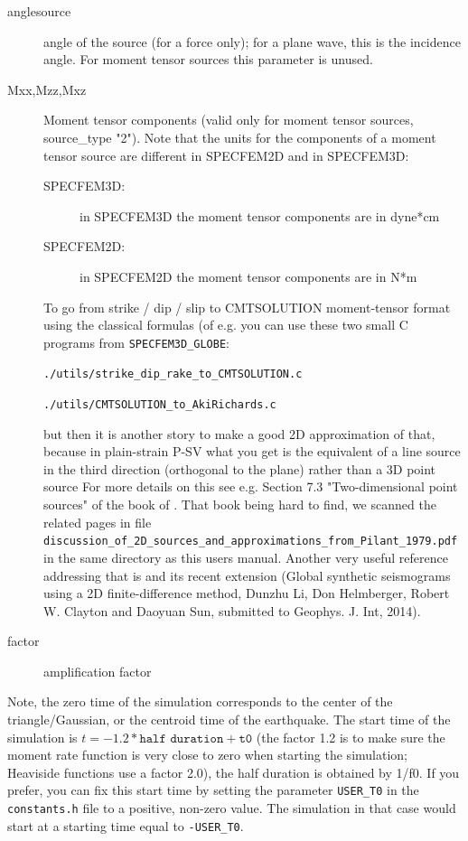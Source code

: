 \documentclass[oneside,english,onecolumn,letterpaper]{book}
\begin{document}
\begin{description}
\item[anglesource] angle of the source (for a force only); for a plane wave, this is the incidence angle. For moment tensor sources this parameter is unused.

\item[Mxx,Mzz,Mxz] Moment tensor components (valid only for moment tensor sources, source\_type "2").
Note that the units for the components of a moment tensor source are different in SPECFEM2D and in SPECFEM3D:
\begin{description}
\item[SPECFEM3D:] in SPECFEM3D the moment tensor components are in dyne*cm
\item[SPECFEM2D:] in SPECFEM2D the moment tensor components are in N*m
\end{description}

To go from strike / dip / slip to CMTSOLUTION moment-tensor format using the classical formulas (of e.g. \cite{AkRi80} you can use these two small C programs from \texttt{SPECFEM3D\_GLOBE}:

\texttt{./utils/strike\_dip\_rake\_to\_CMTSOLUTION.c}

\texttt{./utils/CMTSOLUTION\_to\_AkiRichards.c}

but then it is another story to make a good 2D approximation of that, because in plain-strain P-SV what you get is the equivalent of a line source in the third direction (orthogonal to the plane) rather than a 3D point source
For more details on this see e.g. Section 7.3 "Two-dimensional point sources" of the book of \cite{Pil79}. That book being hard to find, we scanned the related pages in file\\
\texttt{discussion\_of\_2D\_sources\_and\_approximations\_from\_Pilant\_1979.pdf} in the same directory as this users manual.
Another very useful reference addressing that is \cite{HeVi88} and its recent extension 
(Global synthetic seismograms using a 2D finite-difference method,
Dunzhu Li, Don Helmberger, Robert W. Clayton and Daoyuan Sun, submitted to Geophys. J. Int, 2014).

\item[factor] amplification factor

\end{description}
Note, the zero time of the simulation corresponds to the center of the triangle/Gaussian,
or the centroid time of the earthquake. The start time of the simulation
is $t=-1.2*\texttt{half duration} + \texttt{t0}$ (the factor 1.2 is to make sure the moment
rate function is very close to zero when starting the simulation; Heaviside functions use a factor 2.0),
the half duration is obtained by 1/f0.
If you prefer, you can fix this start time by setting the parameter \texttt{USER\_T0} in the \texttt{constants.h} file
to a positive, non-zero value. The simulation in that case would start at a starting time equal to \texttt{-USER\_T0}.
\end{document}
